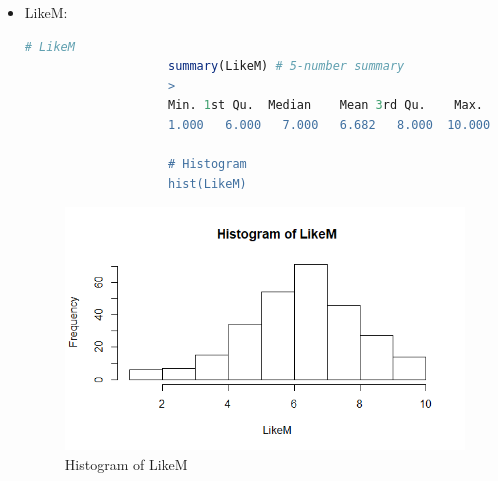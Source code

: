 \documentclass[a4paper,12pt]{article}
\begin{document}
\begin{enumerate}[label = {\alph*)}]
\begin{itemize}
					
					\begin{itemize}
						\item Đồ thị có dạng bell-shape
						\item 25\% Nam đánh giá sức quyến rũ của bạn nữ ít nhất 1 - 5 điểm
						\item 50\% Nam đánh giá sức quyến rũ của bạn nữ trong khoảng 5 - 8 điểm
						\item 25\% Nam đánh giá sức quyến rũ của bạn nữ nhiều nhất từ 8 - 10 điểm
						\item Kết luận:
						\begin{itemize}
							\item 50\% Nam đánh giá sức quyến rũ của bạn nữ ít hơn 7 điểm.
							\item 50\% Nam đánh giá sức quyến rũ của bạn nữ trên 7 điểm.
						\end{itemize}
					\end{itemize}
					
					
				\item LikeM:
					\begin{lstlisting}[language = R]
					# LikeM
					summary(LikeM) # 5-number summary
					> 
					Min. 1st Qu.  Median    Mean 3rd Qu.    Max.    NA's 
					1.000   6.000   7.000   6.682   8.000  10.000       2
					
					# Histogram
					hist(LikeM)
					\end{lstlisting}
					
					\begin{figure}[H]
						\centering
						\includegraphics[width=0.7\linewidth]{Images/Rplot3}
						\caption{Histogram of LikeM}
						\label{fig:rplot3}
					\end{figure}
					

\end{itemize}
\end{enumerate}
\end{document}
